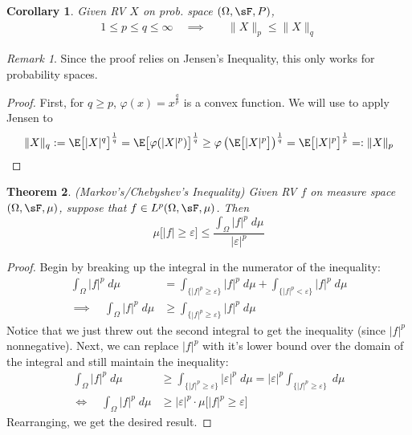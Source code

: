\documentclass[12pt]{article}
\theoremstyle{plain}
\newtheorem{thm}{Theorem}[section]
\newtheorem{cor}[thm]{Corollary}
\theoremstyle{definition}
\theoremstyle{remark}
\newtheorem*{rmk}{Remark}
\begin{document}
\begin{cor}
\label{cor:jensen}
Given RV $X$ on prob. space $(\Omega,\sF,P)$,
\begin{align*}
  1\leq p\leq q\leq \infty
  \quad\implies&\quad
  \lVert X\rVert_p\leq \lVert X\rVert_q
\end{align*}
\end{cor}
\begin{rmk}
Since the proof relies on Jensen's Inequality, this only works for
probability spaces.
\end{rmk}
\begin{proof}
First, for $q\geq p$, $\varphi(x)=x^{\frac{q}{p}}$ is a convex
function. We will use to apply Jensen to
\begin{align*}
  \lVert X\rVert_q
  := \E\big[|X|^q\big]^{\frac{1}{q}}
  = \E\big[\varphi(|X|^p)\big]^{\frac{1}{q}}
  \geq \varphi\left(\E\big[|X|^p\big]\right)^{\frac{1}{q}}
  = \E\big[|X|^p\big]^{\frac{1}{p}}
  =: \lVert X\rVert_p
\end{align*}
\end{proof}


\clearpage
\begin{thm}{\emph{(Markov's/Chebyshev's Inequality)}}
\label{thm:markov}
Given RV $f$ on measure space $(\Omega,\sF,\mu)$, suppose that
$f\in L^p(\Omega,\sF,\mu)$. Then
\begin{equation}
    \label{markov}
    \mu\big[ \left\lvert f\right\rvert \geq \varepsilon\big]
    \leq \frac{\int_\Omega |f|^p\;d\mu}{|\varepsilon|^p}
\end{equation}
\end{thm}
\begin{proof}
Begin by breaking up the integral in the numerator of the inequality:
\begin{align*}
  \int_\Omega |f|^p\;d\mu
  &= \int_{\{|f|^p\geq \varepsilon\}} |f|^p\;d\mu
  + \int_{\{|f|^p< \varepsilon\}} |f|^p\;d\mu
  \\
  \implies\quad
  \int_\Omega |f|^p\;d\mu
  &\geq \int_{\{|f|^p\geq \varepsilon\}} |f|^p\;d\mu
\end{align*}
Notice that we just threw out the second integral to get the inequality
(since $|f|^p$ nonnegative).
Next, we can replace $|f|^p$ with it's lower bound over the domain of
the integral and still maintain the inequality:
\begin{align*}
  \int_\Omega |f|^p\;d\mu
  &\geq
  \int_{\{|f|^p\geq \varepsilon\}} |\varepsilon|^p\;d\mu
  = |\varepsilon|^p\int_{\{|f|^p\geq \varepsilon\}} \;d\mu \\
  \iff\quad
  \int_\Omega |f|^p\;d\mu
  &\geq
  |\varepsilon|^p \cdot \mu\big[ |f|^p \geq \varepsilon \big]
\end{align*}
Rearranging, we get the desired result.
\end{proof}
\end{document}
